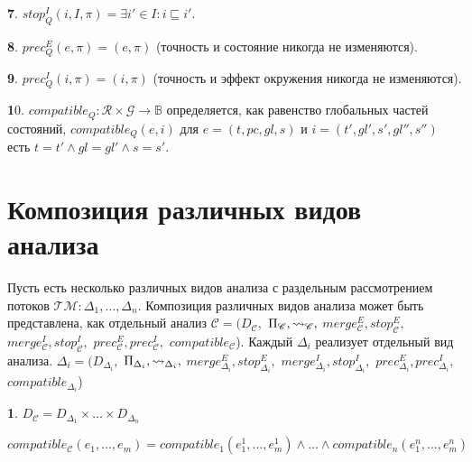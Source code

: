 {\textbf 7.}
$stop^I_Q(i,I,\pi)=\exists i' \in I: i \sqsubseteq i'$.

{\textbf 8.}
$prec^E_Q(e,\pi)=(e,\pi)$ (точность и состояние никогда не изменяются).

{\textbf 9.}
$prec^I_Q(i,\pi)=(i,\pi)$ (точность и эффект окружения никогда не изменяются).

{\textbf 10.} 
$compatible_Q: \mathcal{R}\times\mathcal{G} \to \mathbb{B}$ определяется, как равенство глобальных частей состояний, $compatible_Q(e,i)$ для $e=(t,pc,gl,s)$ и $i=(t',gl',s',gl'',s'')$ есть $t=t' \land gl=gl' \land s=s'$.   

\section{Композиция различных видов анализа}
\label{sect_composite_analysis}

Пусть есть несколько различных видов анализа с раздельным рассмотрением потоков $\mathcal{TM}: \Delta_1, \dots, \Delta_n$. 
Композиция различных видов анализа может быть представлена, как отдельный анализ $\mathscr{C}=(D_{\mathscr{C}},$ $\Pi_{\mathscr{C}}, \leadsto_{\mathscr{C}},$ $merge^E_{\mathscr{C}}, stop^E_{\mathscr{C}},$ $merge^I_{\mathscr{C}}, stop^I_{\mathscr{C}},$ $prec^E_{\mathscr{C}},prec^I_{\mathscr{C}},$ $compatible_{\mathscr{C}}$).
Каждый $\Delta_i$ реализует отдельный вид анализа. 
$\Delta_i=(D_{\Delta_i},$ $\Pi_{\Delta_i}, \leadsto_{\Delta_i},$ $merge^E_{\Delta_i}, stop^E_{\Delta_i},$ $merge^I_{\Delta_i}, stop^I_{\Delta_i},$ $prec^E_{\Delta_i},prec^I_{\Delta_i},$ $compatible_{\Delta_i}$)

{\textbf 1.} $D_{\mathscr{C}} = D_{\Delta_1} \times \dots \times D_{\Delta_n}$

$compatible_{\mathscr{C}}(e_1,\dots, e_m) = 
compatible_1(e_1^1,\dots, e_m^1) \land \dots \land compatible_n(e_1^n,\dots, e_m^n)$

